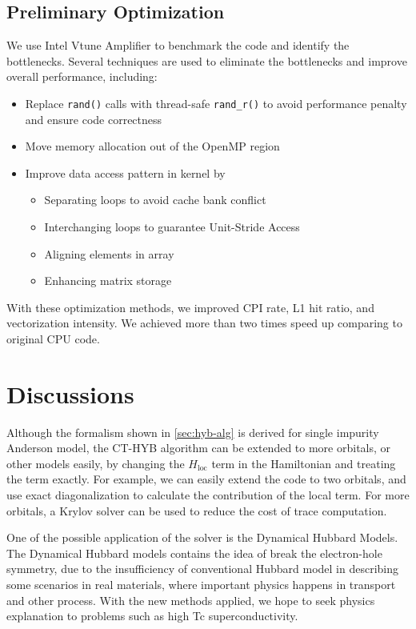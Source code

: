 \subsection{Preliminary Optimization}
We use Intel Vtune Amplifier to benchmark the code and identify the bottlenecks.
Several techniques are used to eliminate the bottlenecks and improve overall
performance, including:
\begin{itemize}
\item Replace \texttt{rand()} calls with thread-safe \texttt{rand\_r()}
  to avoid performance penalty and ensure code correctness
\item Move memory allocation out of the OpenMP region
\item Improve data access pattern in kernel by
\begin{itemize}
  \item Separating loops to avoid cache bank conflict
  \item Interchanging loops to guarantee Unit-Stride Access
  \item Aligning elements in array
  \item Enhancing matrix storage
\end{itemize}
\end{itemize}
With these optimization methods, we improved CPI rate, L1 hit ratio, and 
vectorization intensity. We achieved more than two times speed up comparing to 
original CPU code.



\section{Discussions\label{sec:hyb-concl}}


Although the formalism shown in \ref{sec:hyb-alg} is derived for single 
impurity Anderson model, the CT-HYB algorithm can be extended to more orbitals,
or other models easily, by changing the $H_\textrm{loc}$ term in the Hamiltonian 
and treating the term exactly. For example, we can easily extend the code to two
orbitals, and use exact diagonalization to calculate the contribution of the 
local term. For more orbitals, a Krylov solver \cite{PhysRevB.80.235117} can be used to reduce the cost of
trace computation.

One of the possible application of the solver is the Dynamical Hubbard Models. 
The Dynamical Hubbard models contains the idea of break the electron-hole 
symmetry, due to the insufficiency of conventional Hubbard model in describing 
some scenarios in real materials, where important physics happens in transport 
and other process. With the new methods applied, we hope to seek physics 
explanation to problems such as high Tc superconductivity. 

